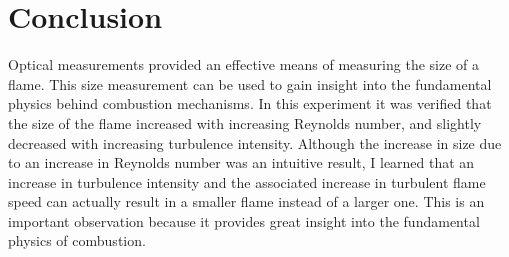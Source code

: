 \documentclass[12pt]{ussci} %
\begin{document}
\section{Conclusion}
Optical measurements provided an effective means of measuring the size of a flame.  This size measurement can be used to gain insight into the fundamental physics behind combustion mechanisms.  In this experiment it was verified that the size of the flame increased with increasing Reynolds number, and slightly decreased with increasing turbulence intensity.  Although the increase in size due to an increase in Reynolds number was an intuitive result, I learned that an increase in turbulence intensity and the associated increase in turbulent flame speed can actually result in a smaller flame instead of a larger one.  This is an important observation because it provides great insight into the fundamental physics of combustion.




\end{document}
